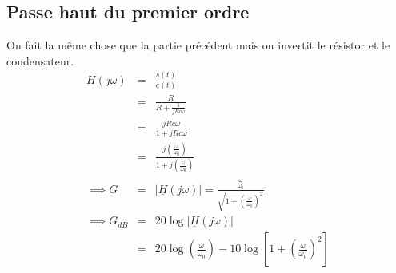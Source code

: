 \subsection{Passe haut du premier ordre}
On fait la même chose que la partie précédent mais on invertit le résistor et le condensateur. 
\begin{eqnarray*}
    H(j \omega ) &=& \frac{s(t)}{e(t)} \\
    &=& \frac{R}{R+\frac{1}{jRc \omega }} \\
    &=&\frac{jRc \omega }{1+jRc \omega } \\
    &=& \frac{j(\frac{\omega}{\omega_{0}})}{1+j(\frac{\omega}{\omega_{0}})} \\
    \implies G &=& \lvert \underline{H}(j \omega) \rvert = \frac{\frac{\omega}{\omega _{0}}}{\sqrt{1+(\frac{\omega}{\omega _{0}})^{2}}} \\
    \implies G_{dB} &=& 20 \log \lvert \underline{H}(j \omega) \rvert \\
    &=& 20 \log (\frac{\omega}{\omega_{0}}) -10 \log \left[ 1+ (\frac{\omega}{\omega_{0}})^{2} \right] 
\end{eqnarray*}
